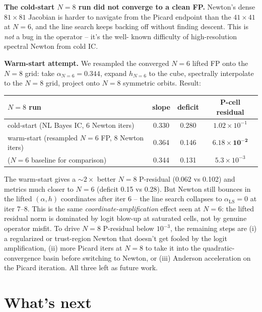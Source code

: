 \documentclass[11pt]{article}
\begin{document}
\textbf{The cold-start $N=8$ run did not converge to a clean FP.} Newton's
dense $81\times 81$ Jacobian is harder to navigate from the Picard endpoint
than the $41\times 41$ at $N=6$, and the line search keeps backing off without
finding descent. This is \emph{not} a bug in the operator -- it's the well-
known difficulty of high-resolution spectral Newton from cold IC.

\textbf{Warm-start attempt.} We resampled the converged $N=6$ lifted FP onto
the $N=8$ grid: take $\alpha_{N=6}=0.344$, expand $h_{N=6}$ to the cube,
spectrally interpolate to the $N=8$ grid, project onto $N=8$ symmetric
orbits. Result:

\begin{center}\begin{tabular}{lccc}\toprule
$N=8$ run & slope & deficit & P-cell residual \\\midrule
cold-start (NL Bayes IC, 6 Newton iters)        & 0.330 & 0.280 & $1.02\times 10^{-1}$ \\
warm-start (resampled $N=6$ FP, 8 Newton iters) & 0.364 & 0.146 & $\mathbf{6.18\times 10^{-2}}$ \\
($N=6$ baseline for comparison)                 & 0.344 & 0.131 & $5.3\times 10^{-3}$ \\
\bottomrule\end{tabular}\end{center}

The warm-start gives a $\sim 2\times$ better $N=8$ P-residual (0.062 vs 0.102)
and metrics much closer to $N=6$ (deficit 0.15 vs 0.28). But Newton still
bounces in the lifted $(\alpha, h)$ coordinates after iter 6 -- the line
search collapses to $\alpha_\mathrm{LS}=0$ at iter 7--8. This is the same
\emph{coordinate-amplification} effect seen at $N=6$: the lifted residual
norm is dominated by logit blow-up at saturated cells, not by genuine
operator misfit. To drive $N=8$ P-residual below $10^{-3}$, the remaining
steps are (i) a regularized or trust-region Newton that doesn't get fooled
by the logit amplification, (ii) more Picard iters at $N=8$ to take it
into the quadratic-convergence basin before switching to Newton, or
(iii) Anderson acceleration on the Picard iteration. All three left as
future work.

\section{What's next}
\end{document}
